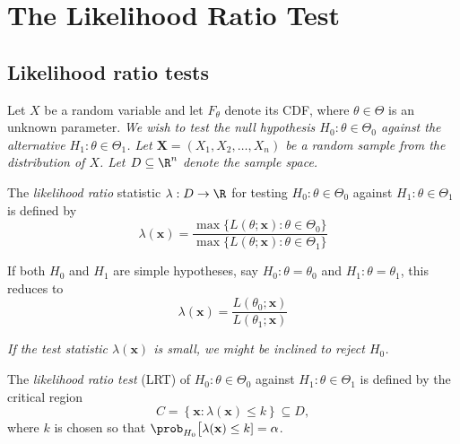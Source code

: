 \chapter{The Likelihood Ratio Test}\label{chap:likelihood-ratio}
\setcounter{page}{1}
\startcontents[chapters]
\chapcontents

\section{Likelihood ratio tests} 
Let $X$ be a random variable and let $F_{\theta}$ denote its CDF, where $\theta\in\Theta$ is an unknown parameter.
\bit
\it We wish to test the null hypothesis $H_0:\theta\in\Theta_0$ against the alternative $H_1:\theta\in\Theta_1$.  
\it Let $\mathbf{X}=(X_1,X_2,\ldots,X_n)$ be a random sample from the distribution of $X$.
\it Let $D\subseteq\R^n$ denote the sample space.
\eit

\begin{definition}
The \emph{likelihood ratio} statistic $\lambda:D\to\R$ for testing $H_0:\theta\in\Theta_0$ against $H_1:\theta\in\Theta_1$ is defined by
\[
\lambda(\mathbf{x}) = \frac{\max\{L(\theta;\mathbf{x}):\theta\in\Theta_0\}}{\max\{L(\theta;\mathbf{x}):\theta\in\Theta_1\}} 
\]
\end{definition}

If both $H_0$ and $H_1$ are simple hypotheses, say $H_0:\theta=\theta_0$ and $H_1:\theta=\theta_1$, this reduces to
\[
\lambda(\mathbf{x}) = \frac{L(\theta_0;\mathbf{x})}{L(\theta_1;\mathbf{x})}
\]

\bit
\it If the test statistic $\lambda(\mathbf{x})$ is small, we might be inclined to reject $H_0$.
\eit

\begin{definition}
The \emph{likelihood ratio test} (LRT) of $H_0:\theta\in\Theta_0$ against $H_1:\theta\in\Theta_1$ is defined by the critical region
\[
C = \left\{\mathbf{x}:\lambda(\mathbf{x}) \leq k\right\} \subseteq D,
\]
where $k$ is chosen so that $\prob_{H_0}\big[\lambda(\mathbf{x})\leq k]=\alpha$.
\end{definition}

